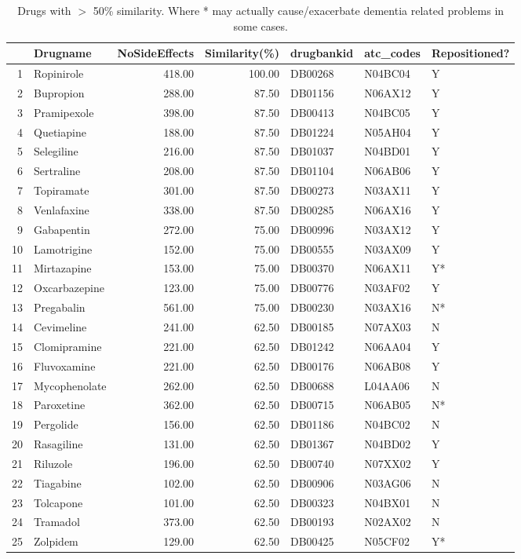 \documentclass[preprint,11pt]{elsarticle}
\begin{document}
\begin{table}[h]
\centering \scriptsize  \caption{Drugs with $>$ 50\% similarity. Where * may actually cause/exacerbate dementia related problems in some cases.}
\begin{tabular}{rlrrlll}
  \hline
 & Drugname & NoSideEffects & Similarity(\%) & drugbankid & atc\_codes&Repositioned? \\ 
  \hline
1 & Ropinirole & 418.00 & 100.00 & DB00268 & N04BC04 & Y\\ 
  2 & Bupropion & 288.00 & 87.50 & DB01156 & N06AX12 & Y\\ 
  3 & Pramipexole & 398.00 & 87.50 & DB00413 & N04BC05 & Y\\ 
  4 & Quetiapine & 188.00 & 87.50 & DB01224 & N05AH04 & Y\\ 
  5 & Selegiline & 216.00 & 87.50 & DB01037 & N04BD01 &Y\\ 
  6 & Sertraline & 208.00 & 87.50 & DB01104 & N06AB06 &Y\\ 
  7 & Topiramate & 301.00 & 87.50 & DB00273 & N03AX11&Y \\ 
  8 & Venlafaxine & 338.00 & 87.50 & DB00285 & N06AX16&Y \\ 
  9 & Gabapentin & 272.00 & 75.00 & DB00996 & N03AX12&Y \\ 
  10 & Lamotrigine & 152.00 & 75.00 & DB00555 & N03AX09&Y \\ 
  11 & Mirtazapine & 153.00 & 75.00 & DB00370 & N06AX11&Y* \\ 
  12 & Oxcarbazepine & 123.00 & 75.00 & DB00776 & N03AF02 &Y\\ 
  13 & Pregabalin & 561.00 & 75.00 & DB00230 & N03AX16 &N*\\ 
  14 & Cevimeline & 241.00 & 62.50 & DB00185 & N07AX03&N \\ 
  15 & Clomipramine & 221.00 & 62.50 & DB01242 & N06AA04&Y \\ 
  16 & Fluvoxamine & 221.00 & 62.50 & DB00176 & N06AB08&Y\\ 
  17 & Mycophenolate& 262.00 & 62.50 & DB00688 & L04AA06&N \\ 
  18 & Paroxetine & 362.00 & 62.50 & DB00715 & N06AB05 &N*\\ 
  19 & Pergolide & 156.00 & 62.50 & DB01186 & N04BC02& N\\ 
  20 & Rasagiline & 131.00 & 62.50 & DB01367 & N04BD02 &Y\\ 
  21 & Riluzole & 196.00 & 62.50 & DB00740 & N07XX02 &Y\\ 
  22 & Tiagabine & 102.00 & 62.50 & DB00906 & N03AG06&N \\ 
  23 & Tolcapone & 101.00 & 62.50 & DB00323 & N04BX01 &N\\ 
  24 & Tramadol & 373.00 & 62.50 & DB00193 & N02AX02 &N\\ 
  25 & Zolpidem & 129.00 & 62.50 & DB00425 & N05CF02 &Y*\\  
   \hline
\end{tabular} \normalsize
\label{drugs2repos}
\end{table}
\end{document}
